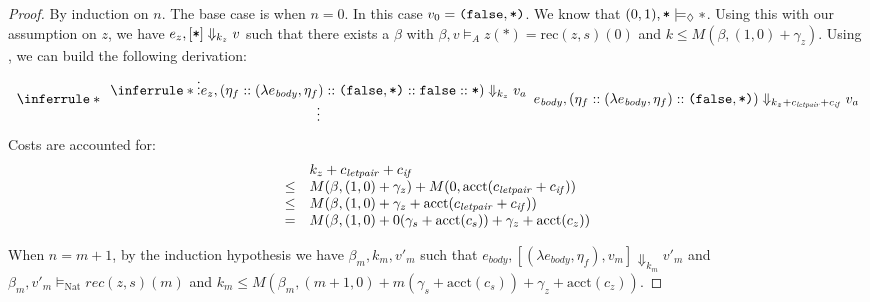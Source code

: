 \documentclass{workingnote}
\newcommand{\account}{\mathrm{acct}}
\newcommand{\TyNat}{\mathrm{Nat}}
\begin{document}
\begin{proof}
  By induction on $n$. The base case is when $n = 0$. In this case
  $v_0 = \texttt{(}\texttt{false},\texttt{*}\texttt{)}$. We know that
  $(0,1), \texttt{*} \models_\Diamond *$. Using this with our assumption on
  $z$, we have $e_z, [\texttt{*}] \Downarrow_{k_z} v$ such that there
  exists a $\beta$ with
  $\beta, v \models_A z(*) = \mathrm{rec}(z,s)(0)$ and
  $k \leq M(\beta, (1,0)+\gamma_z)$. Using ,
  we can build the following derivation:
  \begin{displaymath}
    \inferrule*
    { {\begin{array}{c}
         \inferrule*
         {\vdots}
         {e_z, (\eta_f :: (\lambda e_{\mathit{body}},\eta_f) :: \Pair{\False,\Unit} :: \False :: \Unit) \Downarrow_{k_z} v_a}
         \\
         \vdots
       \end{array}}}
    {e_{\mathit{body}}, (\eta_f :: (\lambda e_{\mathit{body}},\eta_f) :: \Pair{\False,\Unit}) \Downarrow_{k_z + \cnstLetPair + \cnstIf} v_a}
  \end{displaymath}
  Costs are accounted for:
  \begin{displaymath}
    \begin{array}{cl}
      &k_z+\cnstLetPair+\cnstIf \\
      \leq&M(\beta, (1,0) + \gamma_z) + M(0,\account(\cnstLetPair+\cnstIf)) \\
      \leq&M(\beta, (1,0) + \gamma_z + \account(\cnstLetPair+\cnstIf))\\
      =   &M(\beta, (1,0) + 0(\gamma_s + \account(c_s)) + \gamma_z + \account(c_z))
    \end{array}
  \end{displaymath}

  When $n = m + 1$, by the induction hypothesis we have
  $\beta_m, k_m, v'_m$ such that
  $e_{\mathit{body}}, [(\lambda e_{\mathit{body}},\eta_f), v_m]
  \Downarrow_{k_m} v'_m$ and
  $\beta_m, v'_m \models_\TyNat \mathit{rec}(z,s)(m)$ and
  $k_m \leq M(\beta_m, (m+1,0) + m(\gamma_s + \account(c_s)) +
  \gamma_z + \account(c_z))$.


\end{proof}
\end{document}
